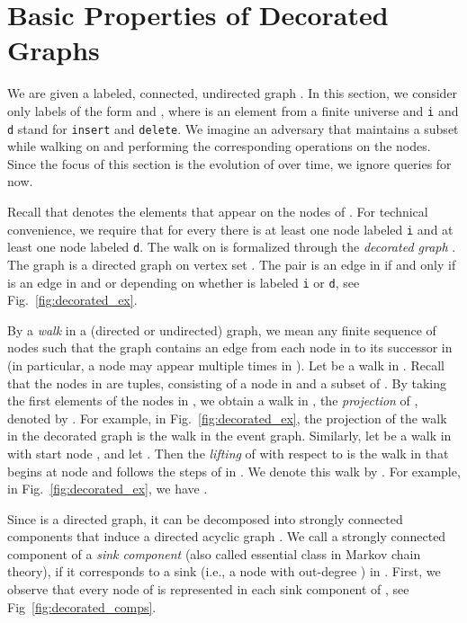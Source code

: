 \documentclass[oribibl,envcountsect,envcountsame]{llncs}
\begin{document}
\section{Basic Properties of Decorated Graphs}

We are given a labeled,
connected, undirected graph . In this section, we 
consider only labels of the form  and , 
where  is an element from a finite universe  and \texttt{i} 
and \texttt{d} stand for \texttt{insert} and 
\texttt{delete}. We imagine an adversary that maintains a subset 
 while walking on  and performing the corresponding operations
on the nodes. Since the focus of this section is the evolution of
 over time, we ignore queries for now.

Recall that   denotes the elements that appear on the nodes of 
.
For technical convenience, we require that for every 
 there is at least one node labeled \texttt{i} and
at least one node labeled \texttt{d}. The walk on  is
formalized through the \emph{decorated graph} . 
The graph  is a directed graph on vertex set 
. The pair  is an 
edge in  if and only if  is an edge in  
and  or 
 depending on whether  is labeled 
\texttt{i} or \texttt{d}, see Fig.~\ref{fig:decorated_ex}. 

By a \emph{walk}  in a (directed or undirected) graph, we mean any finite 
sequence of nodes such that the graph contains an edge from each node in
 to its successor in  (in particular, a node may appear multiple 
times in ).  Let  be a walk in . Recall that the 
nodes in  are tuples, consisting of a node in  and a subset 
of . By taking the first elements of the nodes 
in , we obtain a walk in , the \emph{projection} of , denoted 
by . For example, in Fig.~\ref{fig:decorated_ex}, the projection
of the walk 
 in the decorated graph is the walk
 in the event graph. 
Similarly, let  be a walk in  with start node 
, and let . Then the \emph{lifting} of  with
respect to  is the walk in   that begins at node  and 
follows the steps of  in . We denote this walk by
.
For example, in Fig.~\ref{fig:decorated_ex}, we have
. 


Since  is a directed graph, it can be decomposed into
strongly connected components that induce a directed acyclic
graph . 
We call a strongly connected component of  a \emph{sink 
component} (also called essential class in Markov chain theory), 
if it corresponds to a sink 
(i.e., a node with out-degree ) in . 
First, we observe that every node of  is represented in each sink
component of , see Fig~\ref{fig:decorated_comps}.
\end{document}

